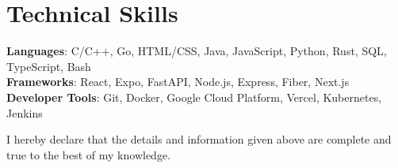 \documentclass[letterpaper,11pt]{article}
\begin{document}
\section{Technical Skills}
 \begin{itemize}[leftmargin=0.15in, label={}]
  \small{\item{
   \textbf{Languages}{: C/C++, Go, HTML/CSS, Java, JavaScript, Python, Rust, SQL, TypeScript, Bash} \\
   \textbf{Frameworks}{: React, Expo, FastAPI, Node.js, Express, Fiber, Next.js} \\
   \textbf{Developer Tools}{: Git, Docker, Google Cloud Platform, Vercel, Kubernetes, Jenkins} \\
  }}
 \end{itemize}

\vspace{2em}
\begin{center}
    \small I hereby declare that the details and information given above are complete and true to the best of my knowledge.
\end{center}
\end{document}
